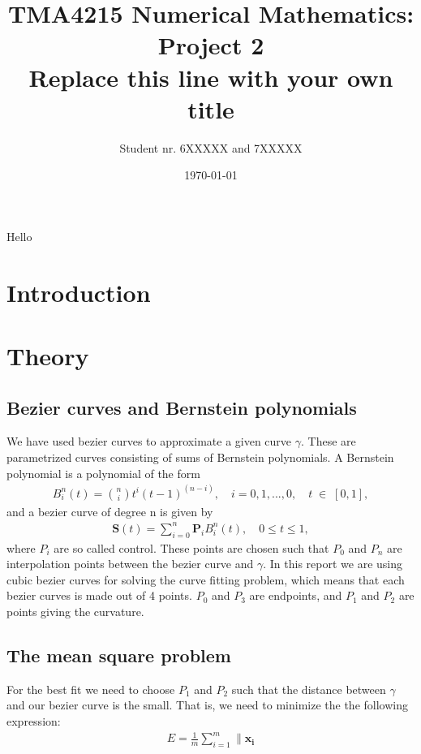 \documentclass[10pt]{article}
\title{TMA4215 Numerical Mathematics: Project 2 \\ Replace this line with your own title}
\author{Student nr. 6XXXXX and 7XXXXX} %
\date{\today}
\begin{document}
\maketitle
Hello
\begin{abstract}

\end{abstract}

\section{Introduction} 

\section{Theory}

\subsection*{Bezier curves and Bernstein polynomials}

We have used bezier curves to approximate a given curve $\gamma$. These are parametrized curves consisting of sums of Bernstein polynomials. A Bernstein polynomial is a polynomial of the form
\begin{align}
B_{i}^n(t) = \binom{n}{i}t^i(t-1)^{(n-i)},\quad i = 0, 1, ..., 0,\quad t \; \in \; [0,1],
\end{align}
and a bezier curve of degree n is given by
\begin{align}
\mathbf{S}(t) = \sum_{i=0}^{n} \mathbf{P}_i B_{i}^n(t), \quad 0 \leq t \leq 1,
\end{align}
where $P_i$ are so called control. These points are chosen such that $P_0$ and $P_n$ are interpolation points between the bezier curve and $\gamma$. In this report we are using cubic bezier curves for solving the curve fitting problem, which means that each bezier curves is made out of 4 points. $P_0$ and $P_3$ are endpoints, and $P_1$ and $P_2$ are points giving the curvature.

\subsection*{The mean square problem}

For the best fit we need to choose $P_1$ and $P_2$ such that the distance between $\gamma$ and our bezier curve is the small. That is, we need to minimize the the following expression:
\begin{align}
E = \frac{1}{m} \sum_{i=1}^m \| \mathbf{x_i}
\end{align}
\end{document}
